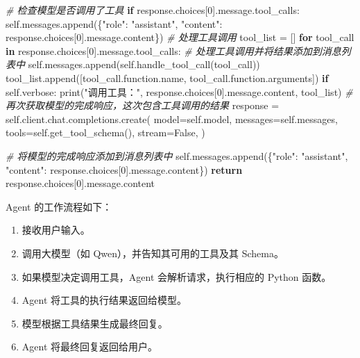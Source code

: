 \documentclass[
]{article}
\newenvironment{Shaded}{}{}
\newcommand{\BuiltInTok}[1]{\textcolor[rgb]{0.00,0.50,0.00}{#1}}
\newcommand{\CommentTok}[1]{\textcolor[rgb]{0.38,0.63,0.69}{\textit{#1}}}
\newcommand{\ControlFlowTok}[1]{\textcolor[rgb]{0.00,0.44,0.13}{\textbf{#1}}}
\newcommand{\DecValTok}[1]{\textcolor[rgb]{0.25,0.63,0.44}{#1}}
\newcommand{\KeywordTok}[1]{\textcolor[rgb]{0.00,0.44,0.13}{\textbf{#1}}}
\newcommand{\NormalTok}[1]{#1}
\newcommand{\OperatorTok}[1]{\textcolor[rgb]{0.40,0.40,0.40}{#1}}
\newcommand{\StringTok}[1]{\textcolor[rgb]{0.25,0.44,0.63}{#1}}
\newcommand{\VariableTok}[1]{\textcolor[rgb]{0.10,0.09,0.49}{#1}}
\providecommand{\tightlist}{%
  \setlength{\itemsep}{0pt}\setlength{\parskip}{0pt}}
\begin{document}
\begin{Shaded}
\begin{Highlighting}[]
        \CommentTok{\# 检查模型是否调用了工具        }
        \ControlFlowTok{if}\NormalTok{ response.choices[}\DecValTok{0}\NormalTok{].message.tool\_calls:}
            \VariableTok{self}\NormalTok{.messages.append(\{}\StringTok{"role"}\NormalTok{: }\StringTok{"assistant"}\NormalTok{, }\StringTok{"content"}\NormalTok{: response.choices[}\DecValTok{0}\NormalTok{].message.content\})}
            \CommentTok{\# 处理工具调用}
\NormalTok{            tool\_list }\OperatorTok{=}\NormalTok{ []}
            \ControlFlowTok{for}\NormalTok{ tool\_call }\KeywordTok{in}\NormalTok{ response.choices[}\DecValTok{0}\NormalTok{].message.tool\_calls:}
                \CommentTok{\# 处理工具调用并将结果添加到消息列表中}
                \VariableTok{self}\NormalTok{.messages.append(}\VariableTok{self}\NormalTok{.handle\_tool\_call(tool\_call))}
\NormalTok{                tool\_list.append([tool\_call.function.name, tool\_call.function.arguments])}
            \ControlFlowTok{if} \VariableTok{self}\NormalTok{.verbose:}
                \BuiltInTok{print}\NormalTok{(}\StringTok{"调用工具："}\NormalTok{, response.choices[}\DecValTok{0}\NormalTok{].message.content, tool\_list)}
            \CommentTok{\# 再次获取模型的完成响应，这次包含工具调用的结果}
\NormalTok{            response }\OperatorTok{=} \VariableTok{self}\NormalTok{.client.chat.completions.create(}
\NormalTok{                model}\OperatorTok{=}\VariableTok{self}\NormalTok{.model,}
\NormalTok{                messages}\OperatorTok{=}\VariableTok{self}\NormalTok{.messages,}
\NormalTok{                tools}\OperatorTok{=}\VariableTok{self}\NormalTok{.get\_tool\_schema(),}
\NormalTok{                stream}\OperatorTok{=}\VariableTok{False}\NormalTok{,}
\NormalTok{            )}

        \CommentTok{\# 将模型的完成响应添加到消息列表中}
        \VariableTok{self}\NormalTok{.messages.append(\{}\StringTok{"role"}\NormalTok{: }\StringTok{"assistant"}\NormalTok{, }\StringTok{"content"}\NormalTok{: response.choices[}\DecValTok{0}\NormalTok{].message.content\})}
        \ControlFlowTok{return}\NormalTok{ response.choices[}\DecValTok{0}\NormalTok{].message.content}
\end{Highlighting}
\end{Shaded}

Agent 的工作流程如下：

\begin{enumerate}
\def\labelenumi{\arabic{enumi}.}
\tightlist
\item
  接收用户输入。
\item
  调用大模型（如 Qwen），并告知其可用的工具及其 Schema。
\item
  如果模型决定调用工具，Agent 会解析请求，执行相应的 Python 函数。
\item
  Agent 将工具的执行结果返回给模型。
\item
  模型根据工具结果生成最终回复。
\item
  Agent 将最终回复返回给用户。
\end{enumerate}
\end{document}
